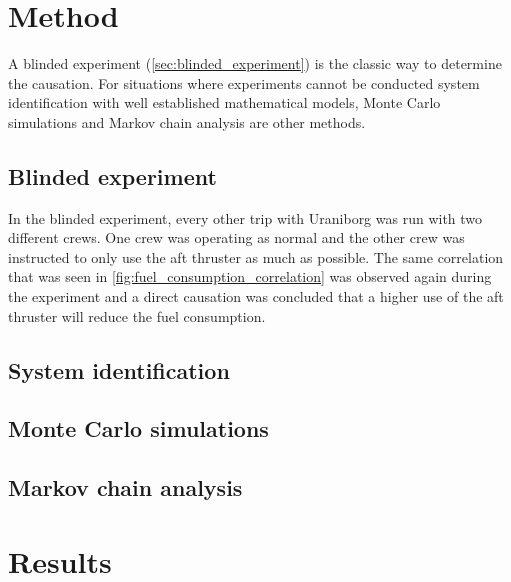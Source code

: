 \documentclass[fleqn,10pt]{olplainarticle}
\begin{document}
\section{Method}
A blinded experiment (\autoref{sec:blinded_experiment}) is the classic way to determine the causation. For situations where experiments cannot be conducted system identification with well established
mathematical models, Monte Carlo simulations and Markov chain analysis are other methods.

\subsection{Blinded experiment}\label{sec:blinded_experiment}
In the blinded experiment, every other trip with Uraniborg was run with two different crews. One crew was operating as normal and the other crew was instructed to only use the aft thruster as much as possible. The same correlation that was seen in \autoref{fig:fuel_consumption_correlation} was observed again during the experiment and a direct causation was concluded that a higher use of the aft thruster will reduce the fuel consumption.

\subsection{System identification}
\subsection{Monte Carlo simulations}
\subsection{Markov chain analysis}

\section{Results}
\end{document}
